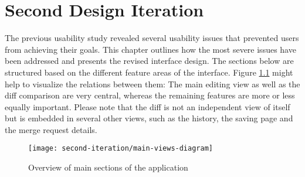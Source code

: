 \chapter{Second Design Iteration} \label{chapter:design-second-iteration}
The previous usability study revealed several usability issues that prevented users from achieving their goals. This chapter outlines how the most severe issues have been addressed and presents the revised interface design. The sections below are structured based on the different feature areas of the interface. Figure \ref{fig:main-views-diagram} might help to visualize the relations between them: The main editing view as well as the diff comparison are very central, whereas the remaining features are more or less equally important. Please note that the diff is not an independent view of itself but is embedded in several other views, such as the history, the saving page and the merge request details.

\begin{figure}[h!]
 \centering
 \texttt{[image: second-iteration/main-views-diagram]}
 \caption{Overview of main sections of the application}
 \label{fig:main-views-diagram}
\end{figure}




